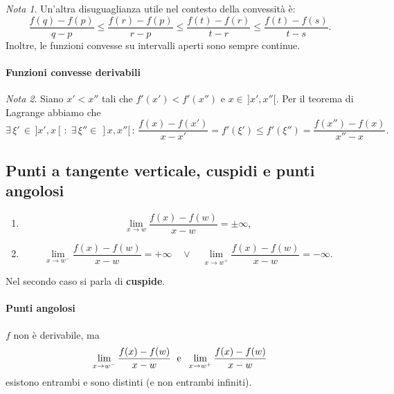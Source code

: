 \documentclass{article}
\theoremstyle{plain}
\theoremstyle{definition}
\theoremstyle{remark}
\newtheorem{note}{Nota}
\begin{document}
\vspace{10pt}

\begin{note}
    Un'altra disuguaglianza utile nel contesto della convessità è:
    \[ \dfrac{f(q) - f(p)}{q - p} \leq \dfrac{f(r) - f(p)}{r - p} \leq \dfrac{f(t) - f(r)}{t - r} \leq \dfrac{f(t) - f(s)}{t - s}.\]
    Inoltre, le funzioni convesse su intervalli aperti sono sempre continue.
\end{note}

\vspace{10pt}

\paragraph{Funzioni convesse derivabili}
\begin{note}
    Siano $x'<x''$ tali che $f'(x')<f'(x'')$ e $x\in\,]x',x''[ $.
    Per il teorema di Lagrange abbiamo che
    \[\exists\,\xi'\,\in\,]x',x[\,:\; \exists\,\xi''\in\,]x,x''[\,:\,\dfrac{f(x)-f(x')}{x-x'}=f'(\xi')\leq f'(\xi'')=\dfrac{f(x'')-f(x)}{x''-x}.\]
\end{note}

\vspace{10pt}

\subsection{Punti a tangente verticale, cuspidi e punti angolosi}

\vspace{10pt}

\begin{enumerate}
    \item \[\lim_{x\to w}\dfrac{f(x)-f(w)}{x-w}=\pm\infty,\]
    \item \[\lim_{x\to w^-}\dfrac{f(x)-f(w)}{x-w}=+\infty \quad\lor\quad \lim_{x\to w^+}\dfrac{f(x)-f(w)}{x-w}=-\infty.\]
\end{enumerate}

Nel secondo caso si parla di \textbf{cuspide}.

\vspace{10pt}

\paragraph{Punti angolosi}
$f$ non è derivabile, ma 
\[\lim_{x\to w^-}\dfrac{f(x)-f(w)}{x-w} \;\textup{ e }\; \lim_{x\to w^+}\dfrac{f(x)-f(w)}{x-w}\] 
esistono entrambi e sono distinti (e non entrambi infiniti).
\end{document}
